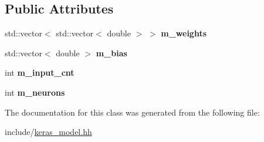\subsection*{Public Attributes}
\begin{DoxyCompactItemize}
\item 
\mbox{\label{classkeras_1_1_layer_dense_a4c37fdf1d48536121eac93d04aa63cbc}} 
std\+::vector$<$ std\+::vector$<$ double $>$ $>$ {\bfseries m\+\_\+weights}
\item 
\mbox{\label{classkeras_1_1_layer_dense_a0597e20b719d018b8cdd52c73ae5438d}} 
std\+::vector$<$ double $>$ {\bfseries m\+\_\+bias}
\item 
\mbox{\label{classkeras_1_1_layer_dense_a27af27cac27ff724ca3bc1406a83dc3f}} 
int {\bfseries m\+\_\+input\+\_\+cnt}
\item 
\mbox{\label{classkeras_1_1_layer_dense_a6f2e25a6c4d983f78383a265193ddbb6}} 
int {\bfseries m\+\_\+neurons}
\end{DoxyCompactItemize}


The documentation for this class was generated from the following file\+:\begin{DoxyCompactItemize}
\item 
include/\mbox{\hyperlink{keras__model_8hh}{keras\+\_\+model.\+hh}}\end{DoxyCompactItemize}
